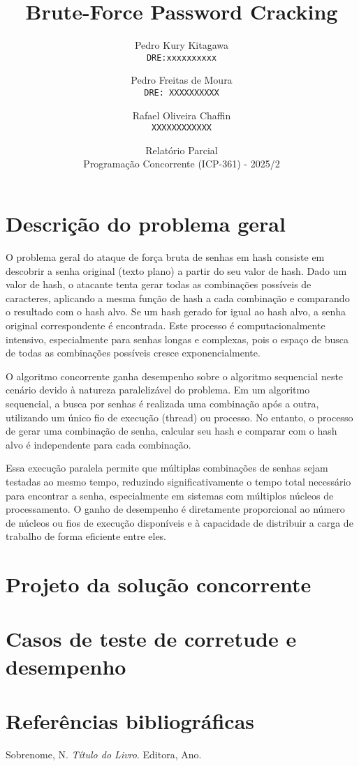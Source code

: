 \documentclass[12pt, a4paper]{article}
\title{Brute-Force Password Cracking}
\author{
  Pedro Kury Kitagawa\\
  \texttt{DRE:xxxxxxxxxx}
  \and
  Pedro Freitas de Moura\\
  \texttt{DRE: XXXXXXXXXX}
  \and
  Rafael Oliveira Chaffin\\
  \texttt{XXXXXXXXXXXX}
}
\date{Relatório Parcial \\ Programação Concorrente (ICP-361) - 2025/2}
\begin{document}
\maketitle
\thispagestyle{empty}

\section{Descrição do problema geral}
O problema geral do ataque de força bruta de senhas em hash consiste em descobrir a senha original (texto plano) a partir do seu valor de hash. Dado um valor de hash, o atacante tenta gerar todas as combinações possíveis de caracteres, aplicando a mesma função de hash a cada combinação e comparando o resultado com o hash alvo. Se um hash gerado for igual ao hash alvo, a senha original correspondente é encontrada. Este processo é computacionalmente intensivo, especialmente para senhas longas e complexas, pois o espaço de busca de todas as combinações possíveis cresce exponencialmente.

O algoritmo concorrente ganha desempenho sobre o algoritmo sequencial neste cenário devido à natureza paralelizável do problema. Em um algoritmo sequencial, a busca por senhas é realizada uma combinação após a outra, utilizando um único fio de execução (thread) ou processo. No entanto, o processo de gerar uma combinação de senha, calcular seu hash e comparar com o hash alvo é independente para cada combinação.

Essa execução paralela permite que múltiplas combinações de senhas sejam testadas ao mesmo tempo, reduzindo significativamente o tempo total necessário para encontrar a senha, especialmente em sistemas com múltiplos núcleos de processamento. O ganho de desempenho é diretamente proporcional ao número de núcleos ou fios de execução disponíveis e à capacidade de distribuir a carga de trabalho de forma eficiente entre eles.

\section{Projeto da solução concorrente}


\section{Casos de teste de corretude e desempenho}


\section{Referências bibliográficas}
\begin{thebibliography}{9}
    Sobrenome, N. \textit{Título do Livro}. Editora, Ano.


\end{thebibliography}
\end{document}
